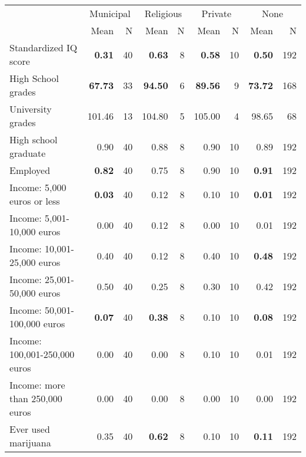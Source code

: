 \begin{tabular}{l r r r r r r r r}
\toprule
& \multicolumn{2}{c}{Municipal} & \multicolumn{2}{c}{Religious} & \multicolumn{2}{c}{Private} & \multicolumn{2}{c}{None} \\
& \scriptsize Mean & \scriptsize N & \scriptsize Mean & \scriptsize N & \scriptsize Mean & \scriptsize N & \scriptsize Mean & \scriptsize N \\
\midrule
Standardized IQ score & \textbf{     0.31} &        40 & \textbf{     0.63} &         8 & \textbf{     0.58} &        10 & \textbf{     0.50} &       192 \\
High School grades & \textbf{    67.73} &        33 & \textbf{    94.50} &         6 & \textbf{    89.56} &         9 & \textbf{    73.72} &       168 \\
University grades &    101.46 &        13 &    104.80 &         5 &    105.00 &         4 &     98.65 &        68 \\
High school graduate &      0.90 &        40 &      0.88 &         8 &      0.90 &        10 &      0.89 &       192 \\
Employed & \textbf{     0.82} &        40 &      0.75 &         8 &      0.90 &        10 & \textbf{     0.91} &       192 \\
Income: 5,000 euros or less & \textbf{     0.03} &        40 &      0.12 &         8 &      0.10 &        10 & \textbf{     0.01} &       192 \\
Income: 5,001-10,000 euros &      0.00 &        40 &      0.12 &         8 &      0.00 &        10 &      0.01 &       192 \\
Income: 10,001-25,000 euros &      0.40 &        40 &      0.12 &         8 &      0.40 &        10 & \textbf{     0.48} &       192 \\
Income: 25,001-50,000 euros &      0.50 &        40 &      0.25 &         8 &      0.30 &        10 &      0.42 &       192 \\
Income: 50,001-100,000 euros & \textbf{     0.07} &        40 & \textbf{     0.38} &         8 &      0.10 &        10 & \textbf{     0.08} &       192 \\
Income: 100,001-250,000 euros &      0.00 &        40 &      0.00 &         8 &      0.10 &        10 &      0.01 &       192 \\
Income: more than 250,000 euros &      0.00 &        40 &      0.00 &         8 &      0.00 &        10 &      0.00 &       192 \\
Ever used marijuana &      0.35 &        40 & \textbf{     0.62} &         8 &      0.10 &        10 & \textbf{     0.11} &       192 \\

\end{tabular}
